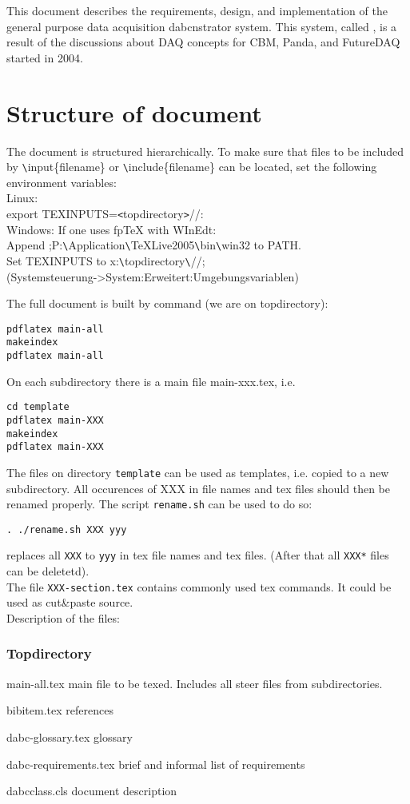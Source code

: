 
This document describes the requirements, design, and implementation of the
general purpose data acquisition dabcnstrator system.
This system, called {\DDA}, is a result of the discussions about DAQ concepts for CBM,
Panda, and FutureDAQ started in 2004.

\section{Structure of document}
The document is structured hierarchically. To make sure that files
to be included by \verb+\+input\{filename\} or \verb+\+include\{filename\}
can be located, set the following environment variables:\\
Linux:\\
export TEXINPUTS=\verb+<+topdirectory\verb+>+//:\\
Windows: If one uses fpTeX with WInEdt:\\
Append ;P:\verb+\+Application\verb+\+TeXLive2005\verb+\+bin\verb+\+win32 to PATH.\\
Set TEXINPUTS to x:\verb+\+topdirectory\verb+\+//;\\
(Systemsteuerung->System:Erweitert:Umgebungsvariablen)

The full document is built by command (we are on topdirectory):
\begin{verbatim}
pdflatex main-all
makeindex
pdflatex main-all
\end{verbatim}
On each subdirectory there is a main file main-xxx.tex, i.e.
\begin{verbatim}
cd template
pdflatex main-XXX
makeindex
pdflatex main-XXX
\end{verbatim}
The files on directory {\tt template} can be used as templates, i.e. copied to a new subdirectory.
All occurences of XXX in file names and tex files should then be renamed properly.
The script {\tt rename.sh} can be used to do so:
\begin{verbatim}
. ./rename.sh XXX yyy
\end{verbatim}
replaces all {\tt XXX} to {\tt yyy} in tex file names and tex files.
(After that all {\tt *XXX*} files can be deletetd).\\
The file {\tt XXX-section.tex} contains commonly used tex commands.
It could be used as cut\&paste source.\\
Description of the files:
\subsubsection{Topdirectory}
\begin{compactdesc}
\item[main-all.tex] main file to be texed. Includes all steer files from subdirectories.
\item[bibitem.tex] references
\item[dabc-glossary.tex] glossary
\item[dabc-requirements.tex] brief and informal list of requirements
\item[dabcclass.cls] document description
\end{compactdesc}
